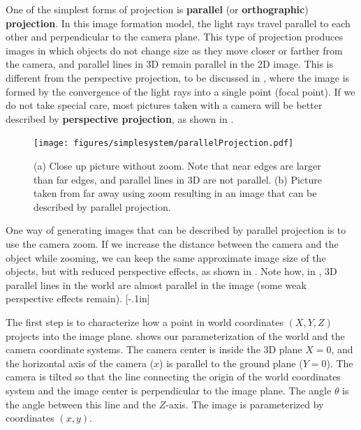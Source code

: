 One of the simplest forms of projection is {\bf parallel} (or {\bf orthographic}) {\bf projection}. In this image formation model, the light rays travel parallel to each other and perpendicular to the camera plane. This type of projection produces images in which objects do not change size as they move closer or farther from the camera, and parallel lines in 3D remain  parallel in the 2D image.  This is different from the perspective projection, to be discussed in \sect{\ref{sec:pinhole_camera_formation}}, where the image is formed by the convergence of the light rays into a single point (focal point). If we do not take special care, most pictures taken with a camera will be better described by {\bf perspective projection}, as shown in .  


\begin{figure}[t]
\centerline{
\texttt{[image: figures/simplesystem/parallelProjection.pdf]}
} 
\caption{(a) Close up picture without zoom. Note that near edges are larger than far edges, and parallel lines in 3D are not parallel. (b) Picture taken from far away using zoom resulting in an image that can be described by parallel projection.} 
\label{fig:parallelProjection}
\end{figure}

One way of generating images that can be described by parallel projection is to use the camera zoom. If we increase the distance between the camera and the object while zooming, we can keep the same approximate image size of the objects, but with reduced perspective effects, as shown in . Note how, in , 3D parallel lines in the world are almost parallel in the image (some weak perspective effects remain). 
[-.1in]


The first step is to characterize how a point in world coordinates $(X,Y,Z)$ projects into the image plane.  shows our parameterization of the world and the camera coordinate systems. The camera center is inside the 3D plane $X=0$, and the horizontal axis of the camera ($x$) is parallel to the ground plane ($Y=0$). The camera is tilted so that the line connecting the origin of the world coordinates system and the image center is perpendicular to the image plane. The angle $\theta$ is the angle between this line and the $Z$-axis. The image is parameterized by coordinates $(x,y)$. 

